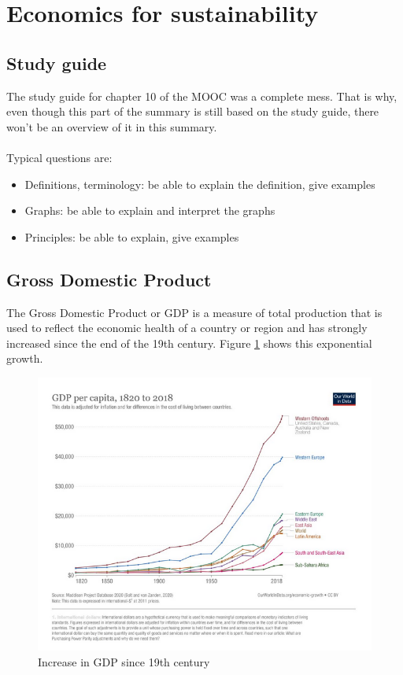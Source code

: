 \documentclass[../summary.tex]{subfiles}
\begin{document}
	
	\section{Economics for sustainability}
	
	\subsection{Study guide}
	
	The study guide for chapter 10 of the MOOC was a complete mess. That is why, even though this part of the summary is still based on the study guide, there won't be an overview of it in this summary.
	\\\\
	Typical questions are:
	\begin{itemize}
		\item Definitions, terminology: be able to explain the definition, give examples
		\item Graphs: be able to explain and interpret the graphs
		\item Principles: be able to explain, give examples
	\end{itemize}
	
	\subsection{Gross Domestic Product}
	
	The Gross Domestic Product or GDP is a measure of total production that is used to reflect the economic health of a country or region and has strongly increased since the end of the 19th century. Figure \ref{fig:GDP} shows this exponential growth.
		
	\begin{figure}[htbp]
		\centering
		\includegraphics[width=1\linewidth]{images/10-GDP-increase.png}
		\caption{Increase in GDP since 19th century}
		\label{fig:GDP}
	\end{figure}
	
\end{document}
